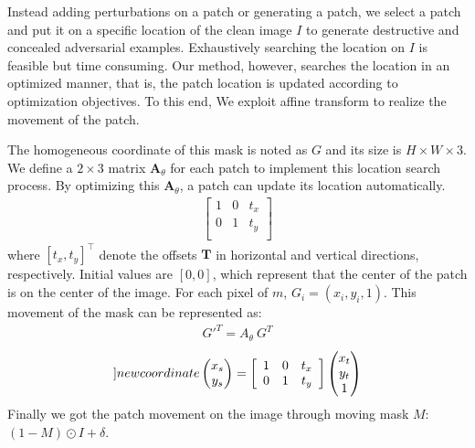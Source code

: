 \documentclass[10pt,twocolumn,letterpaper]{article}
\begin{document}
Instead adding perturbations on a patch
or generating a patch, we select a patch and put it on a specific
location of the clean 
image $I$ to generate destructive and concealed adversarial examples. 
Exhaustively searching the location on $I$ is feasible but time 
consuming. 
Our method, however, searches the location in an optimized manner, 
that is, the patch location is updated according to 
optimization objectives.
To this end, We exploit affine transform to realize the movement of
the patch. 

The homogeneous coordinate of this 
mask is noted as $G$ and its size is $H\times W\times 3$.
We define a $2 \times 3$ matrix 
$\mathbf{A}_\theta$ for each patch to implement this 
location search process.
By optimizing this $\mathbf{A}_\theta$, a patch can update its 
location automatically.
\begin{align}
	\left[
		\begin{array}{ccc}
			1 & 0 & t_x \\
			0 & 1 & t_y \\
		\end{array}
		\right]      
\end{align}
where $[t_x,t_y]^\top$ denote the offsets $\textbf{T}$ in 
horizontal and vertical directions, respectively. 
Initial values are $[0,0]$, which represent
that the center of the patch is on the center of the image.
For each pixel of $m$, $G_i = (x_i, y_i, 1)$.
This movement of the mask can be represented as:
\begin{align}
	{G'}^T = A_{\theta}~{G}^T
\end{align}
\begin{align}
	\label[]{new coordinate}
\begin{pmatrix}
	x_s\\
	y_s	
	\end{pmatrix} = 
		\left[
			\begin{array}{ccc}
				1 & 0 & t_x \\
				0 & 1 & t_y \\
			\end{array}
			\right] 
			\begin{pmatrix}
				x_t\\
				y_t\\
				1	
				\end{pmatrix} 
\end{align}
Finally we got the patch movement on the image 
through moving mask $M$: $(1 - M) \odot I + \delta$.

\end{document}
